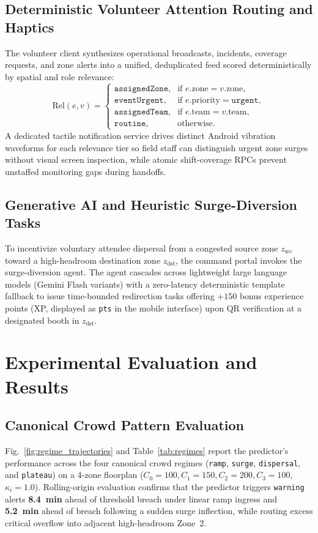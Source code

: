 \documentclass[conference,a4paper]{IEEEtran}
\begin{document}
\subsection{Deterministic Volunteer Attention Routing and Haptics}
The volunteer client synthesizes operational broadcasts, incidents, coverage requests, and zone alerts into a unified, deduplicated feed scored deterministically by spatial and role relevance:
\begin{equation}
\mathrm{Rel}(e, v) = \begin{cases}
\texttt{assignedZone}, & \text{if } e.\mathrm{zone} = v.\mathrm{zone}, \\
\texttt{eventUrgent}, & \text{if } e.\mathrm{priority} = \texttt{urgent}, \\
\texttt{assignedTeam}, & \text{if } e.\mathrm{team} = v.\mathrm{team}, \\
\texttt{routine}, & \text{otherwise.}
\end{cases}
\label{eq:relevance}
\end{equation}
A dedicated tactile notification service drives distinct Android vibration waveforms for each relevance tier so field staff can distinguish urgent zone surges without visual screen inspection, while atomic shift-coverage RPCs prevent unstaffed monitoring gaps during handoffs.

\subsection{Generative AI and Heuristic Surge-Diversion Tasks}
To incentivize voluntary attendee dispersal from a congested source zone $z_{\mathrm{src}}$ toward a high-headroom destination zone $z_{\mathrm{dst}}$, the command portal invokes the surge-diversion agent. The agent cascades across lightweight large language models (Gemini Flash variants) with a zero-latency deterministic template fallback to issue time-bounded redirection tasks offering $+150$ bonus experience points (XP, displayed as \texttt{pts} in the mobile interface) upon QR verification at a designated booth in $z_{\mathrm{dst}}$.

\section{Experimental Evaluation and Results}
\label{sec:eval}
\subsection{Canonical Crowd Pattern Evaluation}
Fig.~\ref{fig:regime_trajectories} and Table~\ref{tab:regimes} report the predictor's performance across the four canonical crowd regimes (\texttt{ramp}, \texttt{surge}, \texttt{dispersal}, and \texttt{plateau}) on a 4-zone floorplan ($C_0=100, C_1=150, C_2=200, C_3=100$, $\kappa_i=1.0$). Rolling-origin evaluation confirms that the predictor triggers \texttt{warning} alerts \textbf{8.4~min} ahead of threshold breach under linear ramp ingress and \textbf{5.2~min} ahead of breach following a sudden surge inflection, while routing excess critical overflow into adjacent high-headroom Zone~2.
\end{document}
